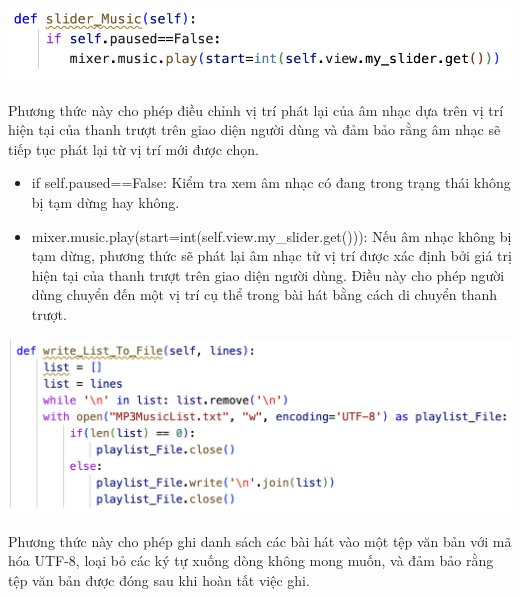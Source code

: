 \documentclass[a4paper]{article}
\begin{document}
\begin{center}
\includegraphics[width=175mm]{template_SGU 2/audio_slider.png}
\end{center}

\hspace*{0.5} Phương thức này cho phép điều chỉnh vị trí phát lại của âm nhạc dựa trên vị trí hiện tại của thanh trượt trên giao diện người dùng và đảm bảo rằng âm nhạc sẽ tiếp tục phát lại từ vị trí mới được chọn.

\begin{itemize}
    \item if self.paused==False: Kiểm tra xem âm nhạc có đang trong trạng thái không bị tạm dừng hay không.
    \item mixer.music.play(start=int(self.view.my\_slider.get())): Nếu âm nhạc không bị tạm dừng, phương thức sẽ phát lại âm nhạc từ vị trí được xác định bởi giá trị hiện tại của thanh trượt trên giao diện người dùng. Điều này cho phép người dùng chuyển đến một vị trí cụ thể trong bài hát bằng cách di chuyển thanh trượt.
\end{itemize}

\begin{center}
\includegraphics[width=175mm]{template_SGU 2/audio_write_List.png}
\end{center}

\hspace*{0.5} Phương thức này cho phép ghi danh sách các bài hát vào một tệp văn bản với mã hóa UTF-8, loại bỏ các ký tự xuống dòng không mong muốn, và đảm bảo rằng tệp văn bản được đóng sau khi hoàn tất việc ghi.
\end{document}
